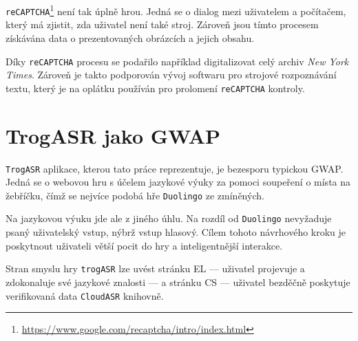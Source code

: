 \verb|reCAPTCHA|\footnote{\url{https://www.google.com/recaptcha/intro/index.html}} \cite{ahn_2008} není tak úplně hrou. Jedná se o dialog mezi uživatelem a počítačem, který má zjistit, zda uživatel není také stroj. Zároveň jsou tímto procesem získávána data o prezentovaných obrázcích a jejich obsahu.

Díky \verb|reCAPTCHA| procesu se podařilo například digitalizovat celý archiv {\sl New York Times}. Zároveň je takto podporován vývoj softwaru pro strojové rozpoznávání textu, který je na oplátku používán pro prolomení \verb|reCAPTCHA| kontroly.

\section{TrogASR jako GWAP}

\verb|TrogASR| aplikace, kterou tato práce reprezentuje, je bezesporu typickou GWAP. Jedná se o webovou hru s účelem jazykové výuky za pomoci soupeření o místa na žebříčku, čímž se nejvíce podobá hře \verb|Duolingo| ze zmíněných.

Na jazykovou výuku jde ale z jiného úhlu. Na rozdíl od \verb|Duolingo| nevyžaduje psaný uživatelský vstup, nýbrž vstup hlasový. Cílem tohoto návrhového kroku je poskytnout uživateli větší pocit  do hry a inteligentnější interakce.

Stran smyslu hry \verb|trogASR| lze uvést stránku EL --- uživatel projevuje a zdokonaluje své jazykové znalosti --- a stránku CS --- uživatel bezděčně poskytuje verifikovaná data \verb|CloudASR| knihovně.
